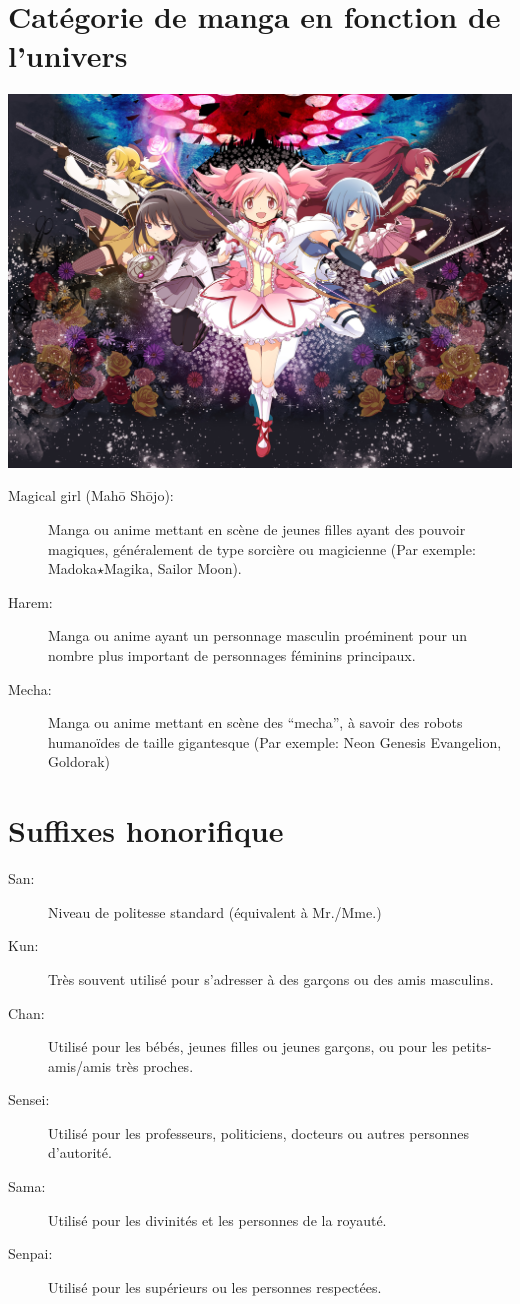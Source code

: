 \section{Catégorie de manga en fonction de l'univers}

\begin{center}
	\includegraphics[scale=0.8]{Madoka.jpg}
\end{center}

\begin{description}
	\item[Magical girl (Mah\=o Sh\=ojo):] Manga ou anime mettant en scène de
		jeunes filles ayant des pouvoir magiques, généralement de type sorcière
		ou magicienne (Par exemple: Madoka$\star$Magika, Sailor Moon).
	\item[Harem:] Manga ou anime ayant un personnage masculin proéminent pour
		un nombre plus important de personnages féminins principaux.
	\item[Mecha:] Manga ou anime mettant en scène des ``mecha'', à savoir des
		robots humanoïdes de taille gigantesque (Par exemple: Neon Genesis
		Evangelion, Goldorak)
\end{description}

\section{Suffixes honorifique}

\begin{description}
	\item[San:] Niveau de politesse standard (équivalent à Mr./Mme.)
	\item[Kun:] Très souvent utilisé pour s'adresser à des garçons ou des amis
		masculins.
	\item[Chan:] Utilisé pour les bébés, jeunes filles ou jeunes garçons, ou
		pour les petits-amis/amis très proches.
	\item[Sensei:] Utilisé pour les professeurs, politiciens, docteurs ou
		autres personnes d'autorité.
	\item[Sama:] Utilisé pour les divinités et les personnes de la royauté.
	\item[Senpai:] Utilisé pour les supérieurs ou les personnes respectées.
\end{description}

